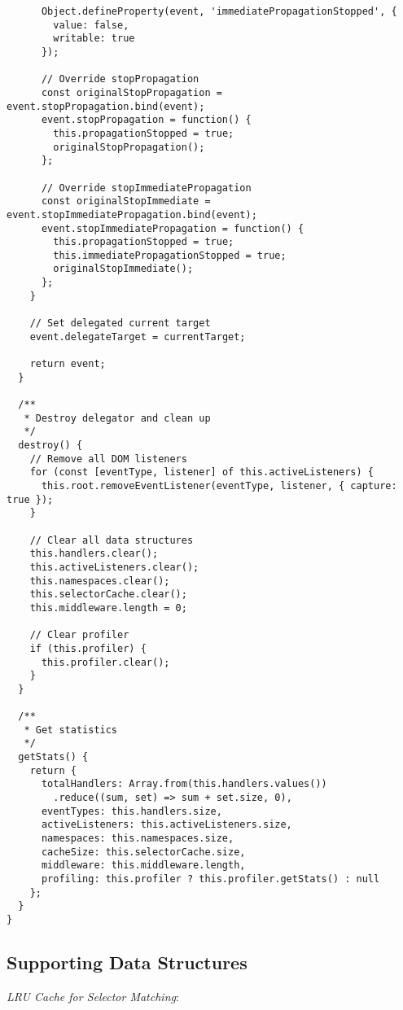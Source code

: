\documentclass[11pt]{article}
\begin{document}
\begin{verbatim}
      Object.defineProperty(event, 'immediatePropagationStopped', {
        value: false,
        writable: true
      });
      
      // Override stopPropagation
      const originalStopPropagation = event.stopPropagation.bind(event);
      event.stopPropagation = function() {
        this.propagationStopped = true;
        originalStopPropagation();
      };
      
      // Override stopImmediatePropagation
      const originalStopImmediate = event.stopImmediatePropagation.bind(event);
      event.stopImmediatePropagation = function() {
        this.propagationStopped = true;
        this.immediatePropagationStopped = true;
        originalStopImmediate();
      };
    }
    
    // Set delegated current target
    event.delegateTarget = currentTarget;
    
    return event;
  }
  
  /**
   * Destroy delegator and clean up
   */
  destroy() {
    // Remove all DOM listeners
    for (const [eventType, listener] of this.activeListeners) {
      this.root.removeEventListener(eventType, listener, { capture: true });
    }
    
    // Clear all data structures
    this.handlers.clear();
    this.activeListeners.clear();
    this.namespaces.clear();
    this.selectorCache.clear();
    this.middleware.length = 0;
    
    // Clear profiler
    if (this.profiler) {
      this.profiler.clear();
    }
  }
  
  /**
   * Get statistics
   */
  getStats() {
    return {
      totalHandlers: Array.from(this.handlers.values())
        .reduce((sum, set) => sum + set.size, 0),
      eventTypes: this.handlers.size,
      activeListeners: this.activeListeners.size,
      namespaces: this.namespaces.size,
      cacheSize: this.selectorCache.size,
      middleware: this.middleware.length,
      profiling: this.profiler ? this.profiler.getStats() : null
    };
  }
}
\end{verbatim}
\subsection{Supporting Data Structures}
\label{sec:org233c2a4}

\emph{LRU Cache for Selector Matching}:
\end{document}

